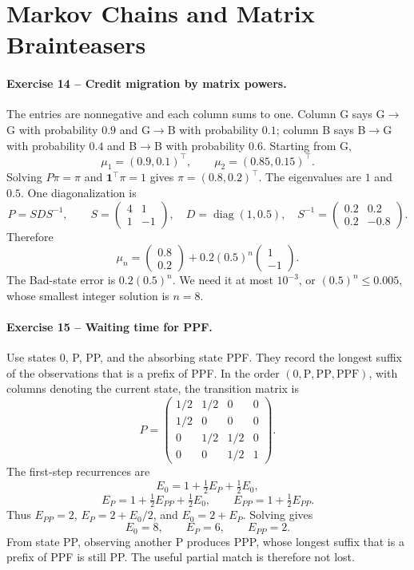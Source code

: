 \documentclass[10pt]{article}
\newcommand{\diag}{\operatorname{diag}}
\begin{document}
\section{Markov Chains and Matrix Brainteasers}

\paragraph{Exercise 14 -- Credit migration by matrix powers.}

The entries are nonnegative and each column sums to one. Column G says
G$\to$G with probability $0.9$ and G$\to$B with probability $0.1$; column B
says B$\to$G with probability $0.4$ and B$\to$B with probability $0.6$.
Starting from G,
\[
\mu_1=(0.9,0.1)^\top,\qquad \mu_2=(0.85,0.15)^\top.
\]
Solving $P\pi=\pi$ and $\mathbf1^\top\pi=1$ gives
$\pi=(0.8,0.2)^\top$. The eigenvalues are $1$ and $0.5$. One diagonalization is
\[
P=SDS^{-1},\qquad
S=\begin{pmatrix}4&1\\1&-1\end{pmatrix},\quad
D=\diag(1,0.5),\quad
S^{-1}=\begin{pmatrix}0.2&0.2\\0.2&-0.8\end{pmatrix}.
\]
Therefore
\[
\mu_n=\begin{pmatrix}0.8\\0.2\end{pmatrix}
+0.2(0.5)^n\begin{pmatrix}1\\-1\end{pmatrix}.
\]
The Bad-state error is $0.2(0.5)^n$. We need it at most $10^{-3}$, or
$(0.5)^n\le0.005$, whose smallest integer solution is $n=8$.

\paragraph{Exercise 15 -- Waiting time for PPF.}

Use states $0$, P, PP, and the absorbing state PPF. They record the longest
suffix of the observations that is a prefix of PPF. In the order
$(0,\mathrm P,\mathrm{PP},\mathrm{PPF})$, with columns denoting the current
state, the transition matrix is
\[
P=\begin{pmatrix}
1/2&1/2&0&0\\
1/2&0&0&0\\
0&1/2&1/2&0\\
0&0&1/2&1
\end{pmatrix}.
\]
The first-step recurrences are
\[
E_0=1+\tfrac12E_P+\tfrac12E_0,
\]
\[
E_P=1+\tfrac12E_{PP}+\tfrac12E_0,
\qquad
E_{PP}=1+\tfrac12E_{PP}.
\]
Thus $E_{PP}=2$, $E_P=2+E_0/2$, and $E_0=2+E_P$. Solving gives
\[
\boxed{E_0=8},\qquad E_P=6,\qquad E_{PP}=2.
\]
From state PP, observing another P produces PPP, whose longest suffix that is
a prefix of PPF is still PP. The useful partial match is therefore not lost.
\end{document}
